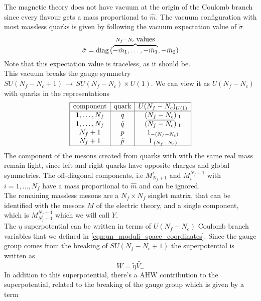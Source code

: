 The magnetic theory does not have vacuum at the origin of the Coulomb branch since every flavour gets a mass proportional to $\hat{m}$.
The vacuum configuration with most massless quarks is given by following the vacuum expectation value of $\tilde{\sigma}$
\begin{equation}
  \tilde{\sigma} = \hbox{diag\,}(\overbrace{- \tilde{m}_1, \dotsc,-\tilde{m}_1}^{N_f - N_c \; \hbox{values}}, -\tilde{m}_2 )
 \end{equation}
Note that this expectation value is traceless, as it should be.\\
This vacuum breaks the gauge symmetry $SU(N_f-N_c + 1) \, \rightarrow \, SU(N_f - N_c) \times U(1)$. 
We can view it as $U(N_f - N_c)$ with quarks in the representations
\begin{equation}
\begin{array} { | c | c | c | }
 \hline
 \hbox{component}& \hbox{quark} & U(N_f - N_c)_{U(1)}  \\
\hline
1,\dotsc,N_f & q & (N_f - N_c)_{\;1}\\
1,\dotsc,N_f & \tilde{q} & (\overline{N_f - N_c})_{\;1}\\
N_f +1 & p & 1_{-(N_f-N_c)}\\
N_f +1 & \tilde{p} & 1_{\;(N_f-N_c)}\\ 
\hline
\end{array}
\end{equation}
The component of the mesons created from quarks with with the same real mass remain light, since left and right quarks have opposite charges and global symmetries. 
The off-diagonal components, i.e $M^i_{N_f+1}$ and $M^{N_f+1}_i$ with $i=1,\dotsc,N_f$ have a mass proportional to $\hat{m}$ and can be ignored.\\
The remaining massless mesons are a $N_f \times N_f$ singlet matrix, that can be identified with the mesons $M$ of the electric theory, and a single component, which is $M^{N_f+1}_{N_f+1}$ which we will call $Y$.\\
The $\eta$ superpotential can be written in terms of $U(N_f - N_c)$ Coulomb branch variables that we defined in \eqref{eqn:un_moduli_space_coordinates}.
Since the gauge group comes from the breaking of $SU(N_f - N_c +1) $ the superpotential is written as
\begin{equation}
 W = \tilde{\eta} \tilde{V_-}
 \end{equation} 
In addition to this superpotential, there's a AHW contribution to the superpotential, related to the breaking of the gauge group which is given by a term 

